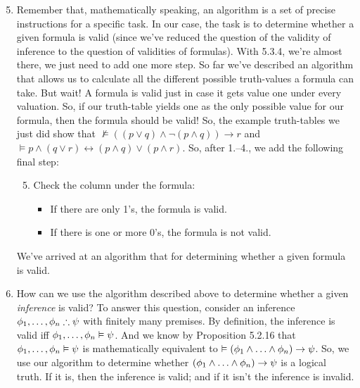 \begin{enumerate}[\thesection.1]

		\setcounter{enumi}{4}
		
		\item Remember that, mathematically speaking, an algorithm is a set of precise instructions for a specific task. In our case, the task is to  determine whether a given formula is valid (since we've reduced the question of the validity of inference to the question of validities of formulas). With 5.3.4, we're almost there, we just need to add one more step. So far we've described an algorithm that allows us to calculate all the different possible truth-values a formula can take. But wait! A formula is valid  just in case it gets value one under every valuation. So, if our truth-table yields one as the only possible value for our formula, then the formula should be valid! So, the example truth-tables we just did show that $\nvDash((p\lor q)\land \neg(p\land q))\to r$ and $\vDash p \land (q \lor r) \leftrightarrow (p \land q) \lor (p \land r)$. So, after 1.--4., we add the following final step: 
		\begin{enumerate}[1.]
		\setcounter{enumii}{4}
		
			\item Check the column under the formula:
			
				\begin{itemize}
				
					\item If there are only 1's, the formula is valid.
					\item If there is one or more 0's, the formula is not valid.
				\end{itemize}
		
		\end{enumerate}
	We've arrived at an algorithm that for determining whether a given formula is valid.
	
	\item How can we use the algorithm described above to determine whether a given \emph{inference} is valid? To answer this question, consider an inference $\phi_1, \mathellipsis,\phi_n\therefore\psi$ with finitely many premises. By definition, the inference is valid iff  $\phi_1, \mathellipsis,\phi_n\vDash\psi$. And we know by Proposition 5.2.16 that $\phi_1, \mathellipsis,\phi_n\vDash\psi$ is mathematically equivalent to $\vDash (\phi_1\land\mathellipsis\land\phi_n)\to \psi$. So, we use our algorithm to determine whether $(\phi_1\land\mathellipsis\land\phi_n)\to \psi$ is a logical truth. If it is, then the inference is valid; and if it isn't the inference is invalid.
	

\end{enumerate}
